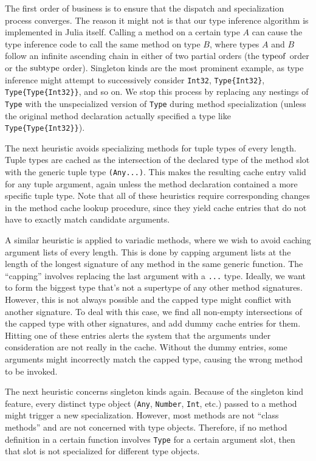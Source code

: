 The first order of business is to ensure that the dispatch and specialization
process converges. The reason it might not is that our type inference algorithm
is implemented in Julia itself. Calling a method on a certain type $A$ can cause
the type inference code to call the same method on type $B$, where types
$A$ and $B$
follow an infinite ascending chain in either of two partial orders (the
$\operatorname{typeof}$ order or the $\operatorname{subtype}$ order). Singleton kinds are the most
prominent example, as type inference might attempt to successively consider
{\tt Int32}, {\tt Type\{Int32\}}, {\tt Type\{Type\{Int32\}\}}, and so on. We
stop this process by replacing any nestings of {\tt Type} with the
unspecialized version of {\tt Type} during method specialization (unless the
original method declaration actually specified a type like
{\tt Type\{Type\{Int32\}\}}).

The next heuristic avoids specializing methods for tuple types of every length.
Tuple types are cached as the intersection of the declared type of the method
slot with the generic tuple type {\tt (Any...)}. This makes the resulting cache
entry valid for any tuple argument, again unless the method declaration
contained a more specific tuple type. Note that all of these heuristics require
corresponding changes in the method cache lookup procedure, since they yield
cache entries that do not have to exactly match candidate arguments.

A similar heuristic is applied to variadic methods, where we wish to avoid
caching argument lists of every length. This is done by capping argument lists
at the length of the longest signature of any method in the same generic
function. The ``capping'' involves replacing the last argument with a
{\tt ...} type. Ideally, we want to form the biggest type that's not a
supertype of any other method signatures. However, this is not always possible
and the capped type might conflict with another signature. To deal with this
case, we find all non-empty intersections of the capped type with other
signatures, and add dummy cache entries for them. Hitting one of these entries
alerts the system that the arguments under consideration are not really in the
cache. Without the dummy entries, some arguments might incorrectly match the
capped type, causing the wrong method to be invoked.

The next heuristic concerns singleton kinds again. Because of the singleton
kind feature, every distinct type object ({\tt Any}, {\tt Number}, {\tt Int},
etc.) passed to a method might trigger a new specialization. However, most
methods are not ``class methods'' and are not concerned with type objects.
Therefore, if no method definition in a certain function involves {\tt Type}
for a certain argument slot, then that slot is not specialized for different
type objects.

